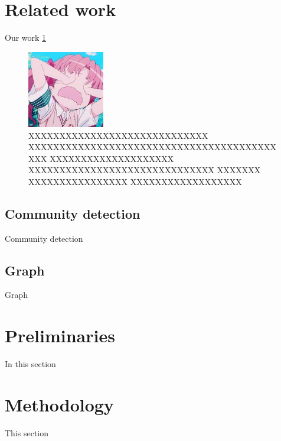 \documentclass[a4paper,fleqn]{cas-dc}
\begin{document}
\begin{sloppypar}
	\section{Related work}
	\label{Related_work}
	\par{
		Our work \ref{FIG:frame}
	}

	\begin{figure}[width=\textwidth,ht!] %
		\centering %
		\includegraphics[width=0.3\textwidth]{./123.png}%
		\caption{XXXXXXXXXXXXXXXXXXXXXXXXXXXXX XXXXXXXXXXXXXXXXXXXXXXXXXXXXXXXXXXXXXXXXXXX XXXXXXXXXXXXXXXXXXXX XXXXXXXXXXXXXXXXXXXXXXXXXXXXXX XXXXXXX XXXXXXXXXXXXXXXX XXXXXXXXXXXXXXXXXX} %
		\label{FIG:frame} %
	\end{figure}

	\subsection{Community detection}
	\par{
		Community detection 
	}

	\subsection{Graph}

	\par{
		Graph
	}



	\section{Preliminaries}
	\label{Preliminaries}
	\par{
		In this section
	}


	\section{Methodology}
	\label{Methodology}
	\par{
		This section 
	}



\end{sloppypar}
\end{document}
